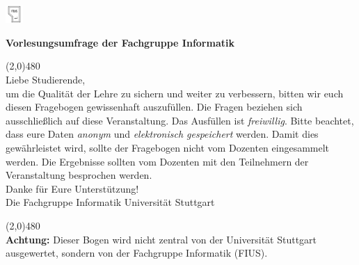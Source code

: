 \documentclass[10pt,a4paper]{article}
\author{Dominik Kesim}
\begin{document}
\begin{floatingfigure}[r]{0.03\textwidth}
\centering
\includegraphics[width=0.05\textwidth]{fius-logo.png}
\end{floatingfigure}
\vspace{-1cm}
\textbf{Vorlesungsumfrage der Fachgruppe Informatik}

\vspace{0.3cm}
\line(2,0){480}
\\
Liebe Studierende,\\

um die Qualität der Lehre zu sichern und weiter zu verbessern, bitten wir euch diesen Fragebogen gewissenhaft auszufüllen. Die Fragen beziehen sich ausschließlich auf diese Veranstaltung. Das Ausfüllen ist \textit{freiwillig}. Bitte beachtet, dass eure Daten \textit{anonym} und \textit{elektronisch gespeichert} werden. Damit dies gewährleistet wird, sollte der Fragebogen nicht vom Dozenten eingesammelt werden. Die Ergebnisse sollten vom Dozenten mit den Teilnehmern der Veranstaltung besprochen werden.\\

Danke für Eure Unterstützung!\\
Die Fachgruppe Informatik Universität Stuttgart

\vspace{2pt}
\line(2,0){480}
\vspace{2pt}\\
\textbf{Achtung:} Dieser Bogen wird nicht zentral von der Universität Stuttgart ausgewertet, sondern von der Fachgruppe Informatik (FIUS).\\
\end{document}
